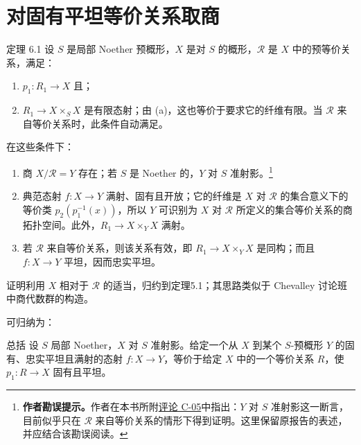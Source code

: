 \section{对固有平坦等价关系取商}
\begin{statement}{定理 6.1}
设 $S$ 是局部 Noether 预概形，$X$ 是对 $S$ 的概形，$\mathcal R$ 是 $X$ 中的预等价关系，满足：
\begin{enumerate}[label=(\alph*)]
 \item $p_1:R_1\to X$ 且；
 \item $R_1\to X\times_SX$ 是有限态射；由 (a)，这也等价于要求它的纤维有限。当 $\mathcal R$ 来自等价关系时，此条件自动满足。
\end{enumerate}
在这些条件下：
\begin{enumerate}[label=(\roman*)]
 \item 商 $X/\mathcal R=Y$ 存在；若 $S$ 是 Noether 的，$Y$ 对 $S$ 准射影。\footnote{\textbf{作者勘误提示。}作者在本书所附\hyperref[orig:7]{评论 C-05}中指出：$Y$ 对 $S$ 准射影这一断言，目前似乎只在 $\mathcal R$ 来自等价关系的情形下得到证明。这里保留原报告的表述，并应结合该勘误阅读。}
 \item 典范态射 $f:X\to Y$ 满射、固有且开放；它的纤维是 $X$ 对 $\mathcal R$ 的集合意义下的等价类 $p_2(p_1^{-1}(x))$，所以 $Y$ 可识别为 $X$ 对 $\mathcal R$ 所定义的集合等价关系的商拓扑空间。此外，$R_1\to X\times_YX$ 满射。
 \item 若 $\mathcal R$ 来自等价关系，则该关系有效，即 $R_1\to X\times_YX$ 是同构；而且 $f:X\to Y$ 平坦，因而忠实平坦。
\end{enumerate}
\end{statement}

证明利用 $X$ 相对于 $\mathcal R$ 的适当，归约到定理5.1；其思路类似于 Chevalley 讨论班中商代数群的构造。

可归纳为：
\begin{statement}{总括}
设 $S$ 局部 Noether，$X$ 对 $S$ 准射影。给定一个从 $X$ 到某个 $S$-预概形 $Y$ 的固有、忠实平坦且满射的态射 $f:X\to Y$，等价于给定 $X$ 中的一个等价关系 $R$，使 $p_1:R\to X$ 固有且平坦。
\end{statement}

